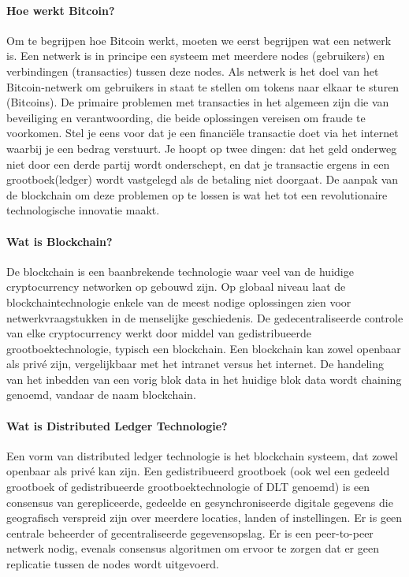 \paragraph{Hoe werkt Bitcoin?} Om te begrijpen hoe Bitcoin werkt, moeten we eerst begrijpen wat een netwerk is. Een netwerk is in principe een systeem met meerdere nodes (gebruikers) en verbindingen (transacties) tussen deze nodes. Als netwerk is het doel van het Bitcoin-netwerk om gebruikers in staat te stellen om tokens naar elkaar te sturen (Bitcoins). De primaire problemen met transacties in het algemeen zijn die van beveiliging en verantwoording, die beide oplossingen vereisen om fraude te voorkomen. Stel je eens voor dat je een financi{\"e}le transactie doet via het internet waarbij je een bedrag verstuurt. Je hoopt op twee dingen: dat het geld onderweg niet door een derde partij wordt onderschept, en dat je transactie ergens in een grootboek(ledger) wordt vastgelegd als de betaling niet doorgaat. De aanpak van de blockchain om deze problemen op te lossen is wat het tot een revolutionaire technologische innovatie maakt. 

\paragraph{Wat is Blockchain?} De blockchain is een baanbrekende technologie waar veel van de huidige cryptocurrency networken op gebouwd zijn. Op globaal  niveau laat de blockchaintechnologie enkele van de meest nodige oplossingen zien voor netwerkvraagstukken in de menselijke geschiedenis. De gedecentraliseerde controle van elke cryptocurrency werkt door middel van gedistribueerde grootboektechnologie, typisch een blockchain. Een blockchain kan zowel openbaar als priv{\'e} zijn, vergelijkbaar met het intranet versus het internet. De handeling van het inbedden van een vorig blok data in het huidige blok data wordt chaining genoemd, vandaar de naam blockchain.


\paragraph{Wat is Distributed Ledger Technologie?} Een vorm van distributed ledger technologie is het blockchain systeem, dat zowel openbaar als priv{\'e} kan zijn. Een gedistribueerd grootboek (ook wel een gedeeld grootboek of gedistribueerde grootboektechnologie of DLT genoemd) is een consensus van gerepliceerde, gedeelde en gesynchroniseerde digitale gegevens die geografisch verspreid zijn over meerdere locaties, landen of instellingen. Er is geen centrale beheerder of gecentraliseerde gegevensopslag. Er is een peer-to-peer netwerk nodig, evenals consensus algoritmen om ervoor te zorgen dat er geen replicatie tussen de nodes wordt uitgevoerd. 

